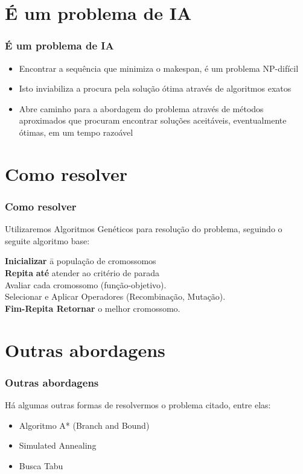 \documentclass[12pt]{beamer}
\begin{document}
\section{É um problema de IA}
\begin{frame}
        \frametitle{É um problema de IA}
        \begin{block}{}
                \begin{itemize}
                        \item Encontrar a sequência que minimiza o makespan, é um problema NP-difícil   \pause
                        \item Isto inviabiliza a procura pela solução ótima através de algoritmos exatos   \pause
                        \item Abre caminho para a abordagem do problema através de métodos aproximados que procuram encontrar soluções aceitáveis, eventualmente ótimas, em um tempo razoável  \pause
                \end{itemize}
        \end{block}
\end{frame}

\section{Como resolver} 
\begin{frame} 
        \frametitle{Como resolver}
        \begin{block}{Utilizaremos Algoritmos Genéticos para resolução do problema, seguindo o seguite algoritmo base:}
	\begin{tabbing}
	{\bf Inicializar} \= a população de cromossomos \\
	{\bf Repita} \= {\bf até} atender ao critério de parada \\
	\> Avaliar cada cromossomo (função-objetivo). \\
	\> Selecionar e Aplicar Operadores (Recombinação, Mutação).\\
	{\bf Fim-Repita Retornar} o melhor cromossomo.
	\end{tabbing}
	\end{block}
\end{frame}

\section{Outras abordagens} 
\begin{frame} 
        \frametitle{Outras abordagens}
        \begin{block}{Há algumas outras formas de resolvermos o problema citado, entre elas:}
                \begin{itemize}
                        \item Algoritmo A* (Branch and Bound)    \pause
                        \item Simulated Annealing   \pause
                        \item Busca Tabu  \pause
                \end{itemize}
        \end{block}
\end{frame}
              
\end{document}
